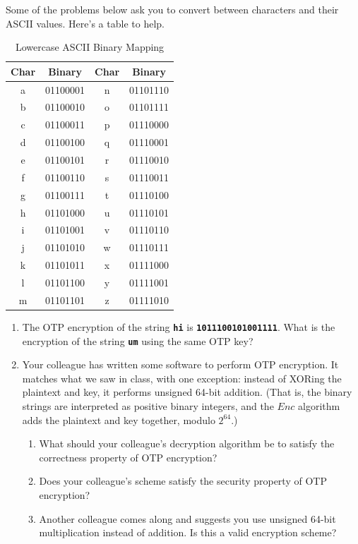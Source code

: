 \documentclass[11pt]{article}
\def\Sym#1{\textbf{\texttt{\color{BrickRed}#1}}}
\begin{document}

\noindent
Some of the problems below ask you to convert between characters and their ASCII values. Here's a table to help.

    \begin{table}[h]
\centering
\begin{tabular}{c c c c}
\textbf{Char} & \textbf{Binary} & \textbf{Char} & \textbf{Binary} \\
\hline
a & 01100001 & n & 01101110 \\
b & 01100010 & o & 01101111 \\
c & 01100011 & p & 01110000 \\
d & 01100100 & q & 01110001 \\
e & 01100101 & r & 01110010 \\
f & 01100110 & s & 01110011 \\
g & 01100111 & t & 01110100 \\
h & 01101000 & u & 01110101 \\
i & 01101001 & v & 01110110 \\
j & 01101010 & w & 01110111 \\
k & 01101011 & x & 01111000 \\
l & 01101100 & y & 01111001 \\
m & 01101101 & z & 01111010 \\
\end{tabular}
\caption{Lowercase ASCII Binary Mapping}
\end{table}
\begin{enumerate}\itemsep3ex\parindent1.5em
\item The OTP encryption of the string \Sym{hi} is \Sym{1011100101001111}. 
What is the encryption of the string \Sym{um} using the same OTP key?
\item Your colleague has written some software to perform OTP encryption.
It matches what we saw in class, with one exception: instead of XORing the
plaintext and key, it performs unsigned 64-bit addition. (That is, the binary
strings are interpreted as positive binary integers, and the $Enc$ algorithm
adds the plaintext and key together, modulo $2^{64}$.)
\begin{enumerate}
    \item What should your colleague's decryption algorithm be to satisfy
    the correctness property of OTP encryption?
    \item Does your colleague's scheme satisfy the security property of OTP
    encryption?
    \item Another colleague comes along and suggests you use unsigned 64-bit
    multiplication instead of addition. Is this a valid encryption scheme?
\end{enumerate}
\end{enumerate}
\end{document}
